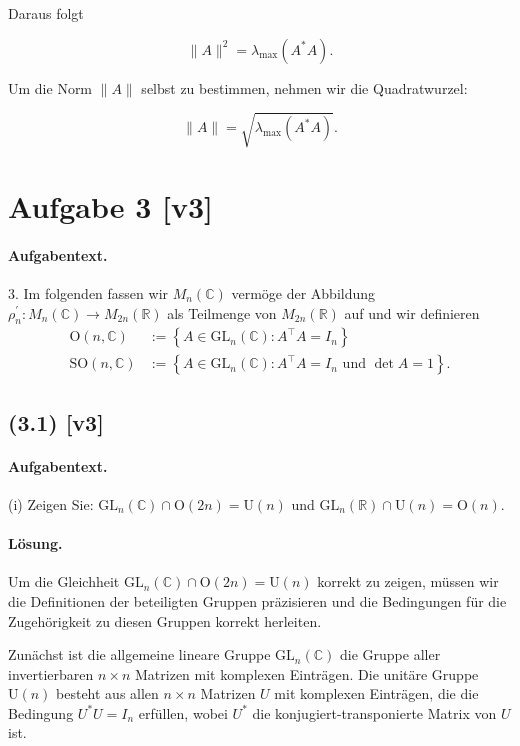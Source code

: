 \documentclass[11pt,a4paper]{article}
\begin{document}
Daraus folgt

\[
\|A\|^2 = \lambda_{\max}(A^* A).
\]

Um die Norm \(\|A\|\) selbst zu bestimmen, nehmen wir die Quadratwurzel:

\[
\|A\| = \sqrt{\lambda_{\max}(A^* A)}.
\]


\section*{Aufgabe 3 [v3]}
\paragraph{Aufgabentext.}
3. Im folgenden fassen wir $M_n(\mathbb{C})$ vermöge der Abbildung $\rho_n^{\prime}: M_n(\mathbb{C}) \rightarrow M_{2 n}(\mathbb{R})$ als Teilmenge von $M_{2 n}(\mathbb{R})$ auf und wir definieren
$$
\begin{aligned}
\mathrm{O}(n, \mathbb{C}) & :=\left\{A \in \mathrm{GL}_n(\mathbb{C}): A^{\top} A=I_n\right\} \\
\mathrm{SO}(n, \mathbb{C}) & :=\left\{A \in \mathrm{GL}_n(\mathbb{C}): A^{\top} A=I_n \text { und } \operatorname{det} A=1\right\} .
\end{aligned}
$$

\subsection*{(3.1) [v3]}
\paragraph{Aufgabentext.}
(i) Zeigen Sie: $\mathrm{GL}_n(\mathbb{C}) \cap \mathrm{O}(2 n)=\mathrm{U}(n)$ und $\mathrm{GL}_n(\mathbb{R}) \cap \mathrm{U}(n)=\mathrm{O}(n)$.

\paragraph{Lösung.}
Um die Gleichheit $\mathrm{GL}_n(\mathbb{C}) \cap \mathrm{O}(2n) = \mathrm{U}(n)$ korrekt zu zeigen, müssen wir die Definitionen der beteiligten Gruppen präzisieren und die Bedingungen für die Zugehörigkeit zu diesen Gruppen korrekt herleiten.

Zunächst ist die allgemeine lineare Gruppe $\mathrm{GL}_n(\mathbb{C})$ die Gruppe aller invertierbaren $n \times n$ Matrizen mit komplexen Einträgen. Die unitäre Gruppe $\mathrm{U}(n)$ besteht aus allen $n \times n$ Matrizen $U$ mit komplexen Einträgen, die die Bedingung $U^* U = I_n$ erfüllen, wobei $U^*$ die konjugiert-transponierte Matrix von $U$ ist.
\end{document}
